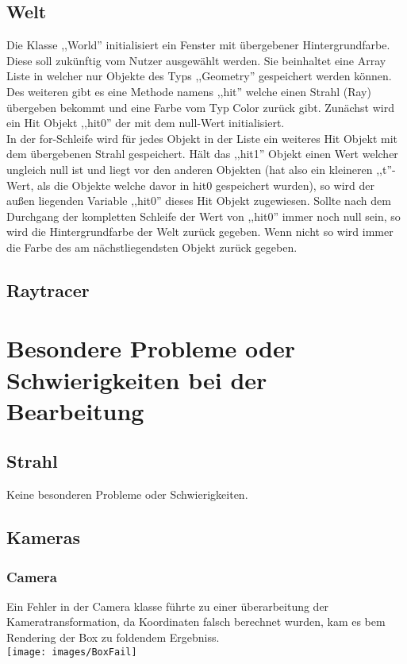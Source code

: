 \documentclass[14pt]{extarticle}
\begin{document}
\subsection{Welt}

Die Klasse ,,World'' initialisiert ein Fenster mit übergebener Hintergrundfarbe. Diese soll zukünftig vom Nutzer ausgewählt werden. Sie beinhaltet eine Array Liste in welcher nur Objekte des Typs ,,Geometry'' gespeichert werden können.\\ 
Des weiteren gibt es eine Methode namens ,,hit'' welche einen Strahl (Ray) übergeben bekommt und eine Farbe vom Typ Color zurück gibt. Zunächst wird ein Hit Objekt ,,hit0'' der mit dem null-Wert initialisiert. \\
In der for-Schleife wird für jedes Objekt in der Liste ein weiteres Hit Objekt mit dem übergebenen Strahl gespeichert. Hält das ,,hit1'' Objekt einen Wert welcher ungleich null ist und liegt vor den anderen Objekten (hat also ein kleineren ,,t''-Wert, als die Objekte welche davor in hit0 gespeichert wurden), so wird der außen liegenden Variable ,,hit0'' dieses Hit Objekt zugewiesen. Sollte nach dem Durchgang der kompletten Schleife der Wert von ,,hit0'' immer noch null sein, so wird die Hintergrundfarbe der Welt zurück gegeben. Wenn nicht so wird immer die Farbe des am nächstliegendsten Objekt zurück gegeben. 

\subsection{Raytracer}



\section{Besondere Probleme oder Schwierigkeiten bei der Bearbeitung}

\subsection{Strahl}
Keine besonderen Probleme oder Schwierigkeiten.
\subsection{Kameras}
\subsubsection{Camera}
Ein Fehler in der Camera klasse führte zu einer überarbeitung der Kameratransformation, da Koordinaten falsch berechnet wurden, kam es bem Rendering der Box zu foldendem Ergebniss.\\
\texttt{[image: images/BoxFail]}
\end{document}
